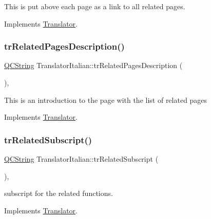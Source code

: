 This is put above each page as a link to all related pages. 

Implements \mbox{\hyperlink{class_translator}{Translator}}.

\mbox{\label{class_translator_italian_a1c40ed15d41b40441b59617f03c6b8ed}} 
\subsubsection{\texorpdfstring{trRelatedPagesDescription()}{trRelatedPagesDescription()}}
{\footnotesize\ttfamily \mbox{\hyperlink{class_q_c_string}{Q\+C\+String}} Translator\+Italian\+::tr\+Related\+Pages\+Description (\begin{DoxyParamCaption}{ }\end{DoxyParamCaption})\hspace{0.3cm}{\ttfamily [inline]}, {\ttfamily [virtual]}}

This is an introduction to the page with the list of related pages 

Implements \mbox{\hyperlink{class_translator}{Translator}}.

\mbox{\label{class_translator_italian_a5c4d31a12192bcf85b45ea492e3777d8}} 
\subsubsection{\texorpdfstring{trRelatedSubscript()}{trRelatedSubscript()}}
{\footnotesize\ttfamily \mbox{\hyperlink{class_q_c_string}{Q\+C\+String}} Translator\+Italian\+::tr\+Related\+Subscript (\begin{DoxyParamCaption}{ }\end{DoxyParamCaption})\hspace{0.3cm}{\ttfamily [inline]}, {\ttfamily [virtual]}}

subscript for the related functions. 

Implements \mbox{\hyperlink{class_translator}{Translator}}.

\mbox{\label{class_translator_italian_a402fc7befaa1e75811a6686df59f64a2}} 
